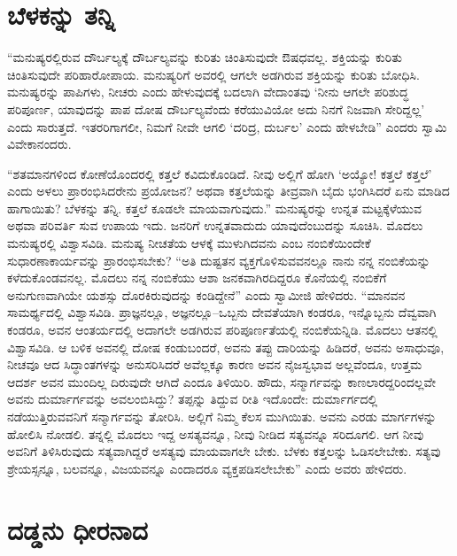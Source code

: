 \section*{ಬೆಳಕನ್ನು ತನ್ನಿ}


“ಮನುಷ್ಯರಲ್ಲಿರುವ ದೌರ್ಬಲ್ಯಕ್ಕೆ ದೌರ್ಬಲ್ಯವನ್ನು ಕುರಿತು ಚಿಂತಿಸುವುದೇ ಔಷಧವಲ್ಲ. ಶಕ್ತಿಯನ್ನು ಕುರಿತು ಚಿಂತಿಸುವುದೇ ಪರಿಹಾರೋಪಾಯ. ಮನುಷ್ಯರಿಗೆ ಅವರಲ್ಲಿ ಆಗಲೇ ಅಡಗಿರುವ ಶಕ್ತಿಯನ್ನು ಕುರಿತು ಬೋಧಿಸಿ. ಮನುಷ್ಯರನ್ನು ಪಾಪಿಗಳು, ನೀಚರು ಎಂದು ಹೇಳುವುದಕ್ಕೆ ಬದಲಾಗಿ ವೇದಾಂತವು ‘ನೀನು ಆಗಲೇ ಪರಿಶುದ್ಧ ಪರಿಪೂರ್ಣ, ಯಾವುದನ್ನು ಪಾಪ ದೋಷ ದೌರ್ಬಲ್ಯವೆಂದು ಕರೆಯುವಿಯೋ ಅದು ನಿನಗೆ ನಿಜವಾಗಿ ಸೇರಿದ್ದಲ್ಲ’ ಎಂದು ಸಾರುತ್ತದೆ. ಇತರರಿಗಾಗಲೀ, ನಿಮಗೆ ನೀವೇ ಆಗಲಿ ‘ದರಿದ್ರ, ದುರ್ಬಲ’ ಎಂದು ಹೇಳಬೇಡಿ” ಎಂದರು ಸ್ವಾಮಿ ವಿವೇಕಾನಂದರು.

“ಶತಮಾನಗಳಿಂದ ಕೋಣೆಯೊಂದರಲ್ಲಿ ಕತ್ತಲೆ ಕವಿದುಕೊಂಡಿದೆ. ನೀವು ಅಲ್ಲಿಗೆ ಹೋಗಿ ‘ಅಯ್ಯೋ! ಕತ್ತಲೆ ಕತ್ತಲೆ’ ಎಂದು ಅಳಲು ಪ್ರಾರಂಭಿಸಿದರೇನು ಪ್ರಯೋಜನ? ಅಥವಾ ಕತ್ತಲೆಯನ್ನು ತೀವ್ರವಾಗಿ ಬೈದು ಭಂಗಿಸಿದರೆ ಏನು ಮಾಡಿದ ಹಾಗಾಯಿತು? ಬೆಳಕನ್ನು ತನ್ನಿ. ಕತ್ತಲೆ ಕೂಡಲೇ ಮಾಯವಾಗುವುದು.” ಮನುಷ್ಯರನ್ನು ಉನ್ನತ ಮಟ್ಟಕ್ಕೆಳೆಯುವ ಅಥವಾ ಪರಿವರ್ತಿ ಸುವ ಉಪಾಯ ಇದು. ಜನರಿಗೆ ಉನ್ನತವಾದುದು ಯಾವುದೆಂಬುದನ್ನು ಸೂಚಿಸಿ. ಮೊದಲು ಮನುಷ್ಯರಲ್ಲಿ ವಿಶ್ವಾಸವಿಡಿ. ಮನುಷ್ಯ ನೀಚತೆಯ ಆಳಕ್ಕೆ ಮುಳುಗಿದವನು ಎಂಬ ನಂಬಿಕೆಯಿಂದೇಕೆ ಸುಧಾರಣಾಕಾರ್ಯವನ್ನು ಪ್ರಾರಂಭಿಸಬೇಕು? “ಅತಿ ದುಷ್ಟತನ ವ್ಯಕ್ತಗೊಳಿಸು\-ವವನಲ್ಲೂ ನಾನು ನನ್ನ ನಂಬಿಕೆಯನ್ನು ಕಳೆದುಕೊಂಡವನಲ್ಲ. ಮೊದಲು ನನ್ನ ನಂಬಿಕೆಯು ಆಶಾ ಜನಕವಾಗಿರದಿದ್ದರೂ ಕೊನೆಯಲ್ಲಿ ನಂಬಿಕೆಗೆ ಅನುಗುಣವಾಗಿಯೇ ಯಶಸ್ಸು ದೊರಕಿರುವುದನ್ನು ಕಂಡಿದ್ದೇನೆ” ಎಂದು ಸ್ವಾಮೀಜಿ ಹೇಳಿದರು. “ಮಾನವನ ಸಾಮರ್ಥ್ಯದಲ್ಲಿ ವಿಶ್ವಾಸವಿಡಿ. ಪ್ರಾಜ್ಞನಲ್ಲೂ, ಅಜ್ಞನಲ್ಲೂ–ಒಬ್ಬನು ದೇವತೆಯಾಗಿ ಕಂಡರೂ, ಇನ್ನೊಬ್ಬನು ದೆವ್ವವಾಗಿ ಕಂಡರೂ, ಅವನ ಆಂತರ್ಯದಲ್ಲಿ ಅದಾಗಲೇ ಅಡಗಿರುವ ಪರಿಪೂರ್ಣತೆಯಲ್ಲಿ ನಂಬಿಕೆಯನ್ನಿಡಿ. ಮೊದಲು ಆತನಲ್ಲಿ ವಿಶ್ವಾಸವಿಡಿ. ಆ ಬಳಿಕ ಅವನಲ್ಲಿ ದೋಷ ಕಂಡುಬಂದರೆ, ಅವನು ತಪ್ಪು ದಾರಿಯನ್ನು ಹಿಡಿದರೆ, ಅವನು ಅಸಾಧುವೂ, ನೀಚವೂ ಆದ ಸಿದ್ಧಾಂತಗಳನ್ನು ಅನುಸರಿಸಿದರೆ ಅವೆಲ್ಲಕ್ಕೂ ಕಾರಣ ಅವನ ನೈಜಸ್ವಭಾವ ಅಲ್ಲವೆಂದೂ, ಉತ್ತಮ ಆದರ್ಶ ಅವನ ಮುಂದಿಲ್ಲ ದಿರುವುದೇ ಆಗಿದೆ ಎಂದೂ ತಿಳಿಯಿರಿ. ಹೌದು, ಸನ್ಮಾರ್ಗವನ್ನು ಕಾಣಲಾರದ್ದರಿಂದಲ್ಲವೇ ಅವನು ದುರ್ಮಾರ್ಗವನ್ನು ಅವಲಂಬಿಸಿದ್ದು? ತಪ್ಪನ್ನು ತಿದ್ದುವ ರೀತಿ ಇದೊಂದೇ: ದುರ್ಮಾರ್ಗದಲ್ಲಿ ನಡೆಯುತ್ತಿರುವವನಿಗೆ ಸನ್ಮಾರ್ಗವನ್ನು ತೋರಿಸಿ. ಅಲ್ಲಿಗೆ ನಿಮ್ಮ ಕೆಲಸ ಮುಗಿಯಿತು. ಅವನು ಎರಡು ಮಾರ್ಗಗಳನ್ನು ಹೋಲಿಸಿ ನೋಡಲಿ. ತನ್ನಲ್ಲಿ ಮೊದಲು ಇದ್ದ ಅಸತ್ಯವನ್ನೂ, ನೀವು ನೀಡಿದ ಸತ್ಯವನ್ನೂ ಸರಿದೂಗಲಿ. ಆಗ ನೀವು ಅವನಿಗೆ ತಿಳಿಸಿರುವುದು ಸತ್ಯವಾಗಿದ್ದರೆ ಅಸತ್ಯವು ಮಾಯವಾಗಲೇ ಬೇಕು. ಬೆಳಕು ಕತ್ತಲನ್ನು ಓಡಿಸಲೇಬೇಕು. ಸತ್ಯವು ಶ್ರೇಯಸ್ಸನ್ನೂ, ಬಲವನ್ನೂ, ವಿಜಯವನ್ನೂ ಎಂದಾದರೂ ವ್ಯಕ್ತಪಡಿಸಲೇಬೇಕು” ಎಂದು ಅವರು ಹೇಳಿದರು.


\section*{ದಡ್ಡನು ಧೀರನಾದ}


